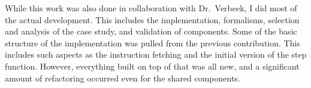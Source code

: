 While this work was also done in collaboration with Dr.~Verbeek, I did most of the actual development.
This includes the implementation, formalisms, selection and analysis of the case study, and validation of components.
Some of the basic structure of the implementation was pulled from the previous contribution.
This includes such aspects as the instruction fetching and the initial version of the step function.
However, everything built on top of that was all new, and a significant amount of refactoring occurred even for the shared components.
